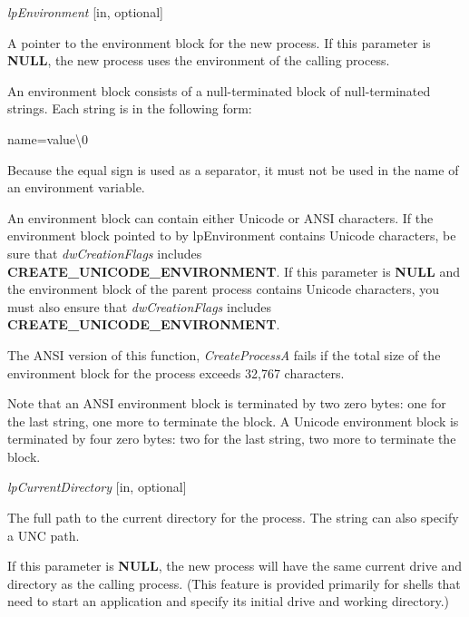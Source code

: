 \documentclass[a4paper]{book}
\newenvironment{customindent}[1]
{\begin{list}{}
	{\setlength{\leftmargin}{#1}}
    	\item[]
    }
{\end{list}}
\begin{document}
\noindent \textit{lpEnvironment} [in, optional]
\begin{customindent}{1cm}
    A pointer to the environment block for the new process. If this parameter is \textbf{NULL}, the new process uses the environment of the calling process.

    An environment block consists of a null-terminated block of null-terminated strings. Each string is in the following form:

    name=value\textbackslash 0

    Because the equal sign is used as a separator, it must not be used in the name of an environment variable.

    An environment block can contain either Unicode or ANSI characters. If the environment block pointed to by lpEnvironment contains Unicode characters, be sure that \textit{dwCreationFlags} includes \newline\textbf{CREATE\_UNICODE\_ENVIRONMENT}. If this parameter is \textbf{NULL} and the environment block of the parent process contains Unicode characters, you must also ensure that \textit{dwCreationFlags} includes \newline\textbf{CREATE\_UNICODE\_ENVIRONMENT}.

    The ANSI version of this function, \textit{CreateProcessA} fails if the total size of the environment block for the process exceeds 32,767 characters.

    Note that an ANSI environment block is terminated by two zero bytes: one for the last string, one more to terminate the block. A Unicode environment block is terminated by four zero bytes: two for the last string, two more to terminate the block.
\end{customindent}

\noindent \textit{lpCurrentDirectory} [in, optional]
\begin{customindent}{1cm}
    The full path to the current directory for the process. The string can also specify a UNC path.

    If this parameter is \textbf{NULL}, the new process will have the same current drive and directory as the calling process. (This feature is provided primarily for shells that need to start an application and specify its initial drive and working directory.)
\end{customindent}
\end{document}

